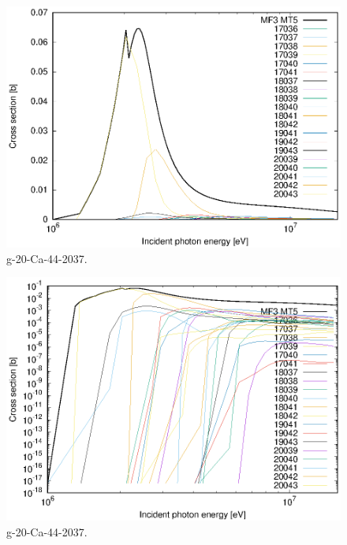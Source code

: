 \begin{figure}
 \includegraphics[width=\linewidth]{eps/g_20-Ca-44_2037.eps}
  \caption{g-20-Ca-44-2037.}
\end{figure}
\begin{figure}
 \includegraphics[width=\linewidth]{eps-log/g_20-Ca-44_2037.eps}
 \caption{g-20-Ca-44-2037.}
\end{figure}
\newpage \clearpage

